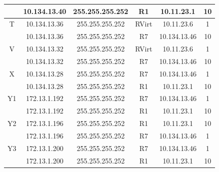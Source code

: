 \documentclass[12pt, a4paper, spanish]{article}
\begin{document}
\begin{center}
\begin{tabular}{|c|c|c|c|c|c|}
	 & 10.134.13.40 & 255.255.255.252 & R1 & 10.11.23.1 & 10\\
	\hline
	T & 10.134.13.36 & 255.255.255.252 & RVirt & 10.11.23.6 & 1\\
	 & 10.134.13.36 & 255.255.255.252 & R7 & 10.134.13.46 & 10\\
	\hline
	V & 10.134.13.32 & 255.255.255.252 & RVirt & 10.11.23.6 & 1\\
	 & 10.134.13.32 & 255.255.255.252 & R7 & 10.134.13.46 & 10\\
	\hline
	X & 10.134.13.28 & 255.255.255.252 & R7 & 10.134.13.46 & 1\\
	 & 10.134.13.28 & 255.255.255.252 & R1 & 10.11.23.1 & 10\\
	\hline
	Y1 & 172.13.1.192 & 255.255.255.252 & R7 & 10.134.13.46 & 1\\
	 & 172.13.1.192 & 255.255.255.252 & R1 & 10.11.23.1 & 10\\
	\hline
	Y2 & 172.13.1.196 & 255.255.255.252 & R1 & 10.11.23.1 & 10\\
	 & 172.13.1.196 & 255.255.255.252 & R7 & 10.134.13.46 & 1\\
	\hline
	Y3 & 172.13.1.200 & 255.255.255.252 & R7 & 10.134.13.46 & 1\\
	 & 172.13.1.200 & 255.255.255.252 & R1 & 10.11.23.1 & 10\\
	\hline
\end{tabular}
\end{center}
\end{document}
